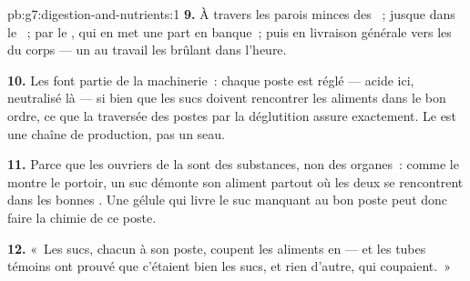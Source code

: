 \begin{solution}{pb:g7:digestion-and-nutrients:1}
\textbf{9.} À travers les parois minces des ~; jusque dans
le ~; par le , qui en met une part en banque~; puis en
livraison générale vers les  du corps --- un  au
travail les brûlant dans l'heure.

\textbf{10.} Les  font partie de la machinerie~: chaque
poste est réglé --- acide ici, neutralisé là --- si bien que les
sucs doivent rencontrer les aliments dans le bon ordre, ce que la
traversée des postes par la déglutition assure exactement. Le  est une chaîne de production, pas un seau.

\textbf{11.} Parce que les ouvriers de la  sont des
substances, non des organes~: comme le montre le portoir, un suc
démonte son aliment partout où les deux se rencontrent dans les
bonnes . Une gélule qui livre le suc manquant au bon poste
peut donc faire la chimie de ce poste.

\textbf{12.} «~Les sucs, chacun à son poste, coupent les aliments en
 --- et les tubes témoins ont prouvé que c'étaient bien
les sucs, et rien d'autre, qui coupaient.~»
\end{solution}
